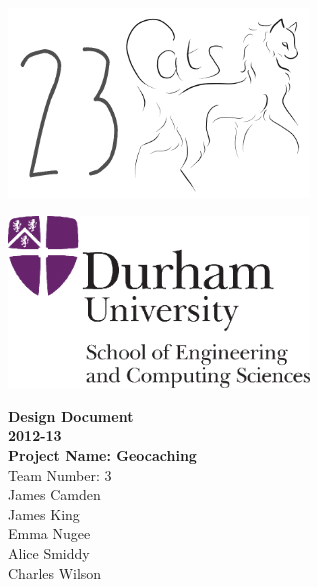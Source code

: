 \newcommand{\authorline}[1]{{\LARGE #1}\\[1cm]}

\begin{titlepage}
\begin{center}
\begin{minipage}{0.4\textwidth}
\begin{flushleft}
\includegraphics[width=0.6\textwidth]{images/logowhite}~\\[2cm]
\end{flushleft}
\end{minipage}
\begin{minipage}{0.4\textwidth}
\begin{flushright}
\includegraphics[width=0.6\textwidth]{logo}~\\[2cm]
\end{flushright}
\end{minipage}

\vspace{3cm}
{\bf
    {\Huge Design Document} \\
    [1cm]

    {\Huge 2012-13} \\
    [1cm]

    {\Huge Project Name: Geocaching} \\
    [2cm]
}
{\huge Team Number: 3} \\
[1cm]

\authorline{James Camden}

\authorline{James King}

\authorline{Emma Nugee}

\authorline{Alice Smiddy}

\authorline{Charles Wilson}
\end{center}
\end{titlepage}
